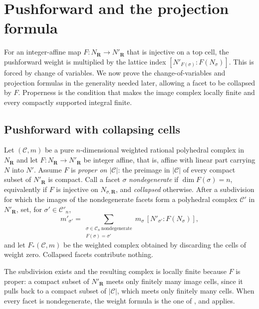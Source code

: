 \section{Pushforward and the projection formula}
\label{sec:ch11-pushforward}

For an integer-affine map $F:N_{\mathbf R}\to N'_{\mathbf R}$ that is
injective on a top cell, the pushforward weight is multiplied by the lattice
index $[N'_{F(\sigma)}:F(N_\sigma)]$. This is forced by change of variables.
We now prove the change-of-variables and projection formulas in the
generality needed later, allowing a facet to be collapsed by $F$.  Properness
is the condition that makes the image complex locally finite and every
compactly supported integral finite.

\subsection{Pushforward with collapsing cells}
\label{sec:ch11-pushforward-def}

\begin{definition}
\label{def:ch11-proper-pushforward}
Let $(\mathscr C,m)$ be a pure $n$-dimensional weighted rational polyhedral
complex in $N_{\mathbf R}$ and let $F:N_{\mathbf R}\to N'_{\mathbf R}$ be
integer affine, that is, affine with linear part carrying $N$ into $N'$.
Assume $F$ is \emph{proper on $|\mathscr C|$}: the preimage in
$|\mathscr C|$ of every compact subset of $N'_{\mathbf R}$ is compact.  Call
a facet $\sigma$ \emph{nondegenerate} if $\dim F(\sigma)=n$, equivalently if
$F$ is injective on $N_{\sigma,\mathbf R}$, and \emph{collapsed} otherwise.
After a subdivision for which the images of the nondegenerate facets form a
polyhedral complex $\mathscr C'$ in $N'_{\mathbf R}$, set, for
$\sigma'\in\mathscr C'_n$,
\[
 m'_{\sigma'}
 =\sum_{\substack{\sigma\in\mathscr C_n\ \text{nondegenerate}\\
                  F(\sigma)=\sigma'}}
   m_\sigma\,[N'_{\sigma'}:F(N_\sigma)],
\]
and let $F_*(\mathscr C,m)$ be the weighted complex obtained by discarding
the cells of weight zero.  Collapsed facets contribute nothing.
\end{definition}

The subdivision exists and the resulting complex is locally finite
because $F$ is proper: a compact subset of $N'_{\mathbf R}$ meets only
finitely many image cells, since it pulls back to a compact subset of
$|\mathscr C|$, which meets only finitely many cells.  When every facet is
nondegenerate, the weight formula is the one of
, and
 applies.

